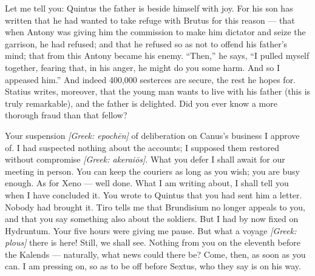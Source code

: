

 Let me tell you: Quintus the father is beside himself with joy. For his son has written that he had wanted to take refuge with Brutus for this reason --- that when Antony was giving him the commission to make him dictator and seize the garrison, he had refused; and that he refused so as not to offend his father's mind; that from this Antony became his enemy. ``Then,'' he says, ``I pulled myself together, fearing that, in his anger, he might do you some harm. And so I appeased him.'' And indeed 400,000 sesterces are secure, the rest he hopes for. Statius writes, moreover, that the young man wants to live with his father (this is truly remarkable), and the father is delighted. Did you ever know a more thorough fraud than that fellow?

 Your suspension \textit{[Greek: epoch\=en]} of deliberation on Canus's business I approve of. I had suspected nothing about the accounts; I supposed them restored without compromise \textit{[Greek: akerai\={o}s]}. What you defer I shall await for our meeting in person. You can keep the couriers as long as you wish; you are busy enough. As for Xeno --- well done. What I am writing about, I shall tell you when I have concluded it. You wrote to Quintus that you had sent him a letter. Nobody had brought it. Tiro tells me that Brundisium no longer appeals to you, and that you say something also about the soldiers. But I had by now fixed on Hydruntum. Your five hours were giving me pause. But what a voyage \textit{[Greek: plous]} there is here! Still, we shall see. Nothing from you on the eleventh before the Kalends --- naturally, what news could there be? Come, then, as soon as you can. I am pressing on, so as to be off before Sextus, who they say is on his way.
